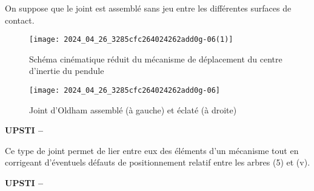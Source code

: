 On suppose que le joint est assemblé sans jeu entre les différentes surfaces de contact.

\begin{figure}[!h]
\centering
\texttt{[image: 2024\_04\_26\_3285cfc264024262add0g-06(1)]}
\caption{\label{ccmp2023_fig_06} Schéma cinématique réduit du mécanisme de déplacement du centre d'inertie du pendule}
\end{figure}

\begin{figure}[!h]
\centering
\texttt{[image: 2024\_04\_26\_3285cfc264024262add0g-06]}
\caption{\label{ccmp2023_fig_07} Joint d'Oldham assemblé (à gauche) et éclaté (à droite)}
\end{figure}
\fi


\ifprof
\begin{corrige}
\textbf{UPSTI -- }

\end{corrige}
\else
\fi


\ifprof
\else
Ce type de joint permet de lier entre eux des éléments d'un mécanisme tout en corrigeant d'éventuels défauts de positionnement relatif entre les arbres (5) et (v).
\fi

\ifprof
\begin{corrige}
\textbf{UPSTI -- }

\end{corrige}
\else
\fi


